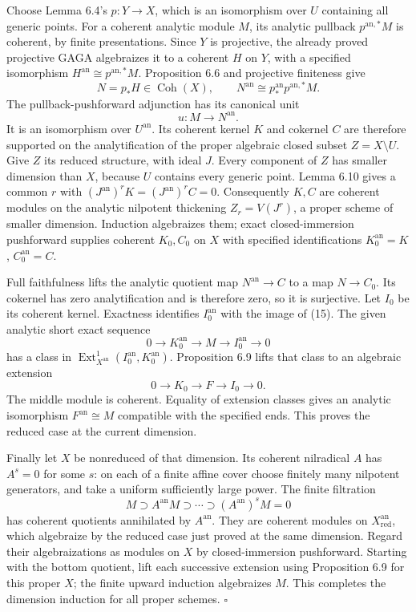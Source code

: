 \documentclass[11pt]{article}
\begin{document}
Choose Lemma 6.4's \(p:Y\to X\), which is an isomorphism over \(U\)
containing all generic points. For a coherent analytic module \(M\), its
analytic pullback \(p^{\mathrm{an},*}M\) is coherent, by finite
presentations. Since \(Y\) is projective, the already proved projective
GAGA algebraizes it to a coherent \(H\) on \(Y\), with a specified
isomorphism \(H^{\mathrm{an}}\cong p^{\mathrm{an},*}M\). Proposition 6.6
and projective finiteness give \[
N=p_*H\in\operatorname{Coh}(X),\qquad
N^{\mathrm{an}}\cong p^{\mathrm{an}}_*p^{\mathrm{an},*}M.
\] The pullback-pushforward adjunction has its canonical unit \[
u:M\longrightarrow N^{\mathrm{an}}.
\tag{15}
\] It is an isomorphism over \(U^{\mathrm{an}}\). Its coherent kernel
\(K\) and cokernel \(C\) are therefore supported on the analytification
of the proper algebraic closed subset \(Z=X\setminus U\). Give \(Z\) its
reduced structure, with ideal \(J\). Every component of \(Z\) has
smaller dimension than \(X\), because \(U\) contains every generic
point. Lemma 6.10 gives a common \(r\) with
\((J^{\mathrm{an}})^rK=(J^{\mathrm{an}})^rC=0\). Consequently \(K,C\)
are coherent modules on the analytic nilpotent thickening
\(Z_r=V(J^r)\), a proper scheme of smaller dimension. Induction
algebraizes them; exact closed-immersion pushforward supplies coherent
\(K_0,C_0\) on \(X\) with specified identifications
\(K_0^{\mathrm{an}}=K\), \(C_0^{\mathrm{an}}=C\).

Full faithfulness lifts the analytic quotient map
\(N^{\mathrm{an}}\to C\) to a map \(N\to C_0\). Its cokernel has zero
analytification and is therefore zero, so it is surjective. Let \(I_0\)
be its coherent kernel. Exactness identifies \(I_0^{\mathrm{an}}\) with
the image of (15). The given analytic short exact sequence \[
0\to K_0^{\mathrm{an}}\to M\to I_0^{\mathrm{an}}\to0
\] has a class in
\(\operatorname{Ext}^1_{X^{\mathrm{an}}}(I_0^{\mathrm{an}},K_0^{\mathrm{an}})\).
Proposition 6.9 lifts that class to an algebraic extension \[
0\to K_0\to F\to I_0\to0.
\] The middle module is coherent. Equality of extension classes gives an
analytic isomorphism \(F^{\mathrm{an}}\cong M\) compatible with the
specified ends. This proves the reduced case at the current dimension.

Finally let \(X\) be nonreduced of that dimension. Its coherent
nilradical \(A\) has \(A^s=0\) for some \(s\): on each of a finite
affine cover choose finitely many nilpotent generators, and take a
uniform sufficiently large power. The finite filtration \[
M\supset A^{\mathrm{an}}M\supset\cdots\supset(A^{\mathrm{an}})^sM=0
\] has coherent quotients annihilated by \(A^{\mathrm{an}}\). They are
coherent modules on \(X_{\mathrm{red}}^{\mathrm{an}}\), which algebraize
by the reduced case just proved at the same dimension. Regard their
algebraizations as modules on \(X\) by closed-immersion pushforward.
Starting with the bottom quotient, lift each successive extension using
Proposition 6.9 for this proper \(X\); the finite upward induction
algebraizes \(M\). This completes the dimension induction for all proper
schemes. \(\square\)
\end{document}

